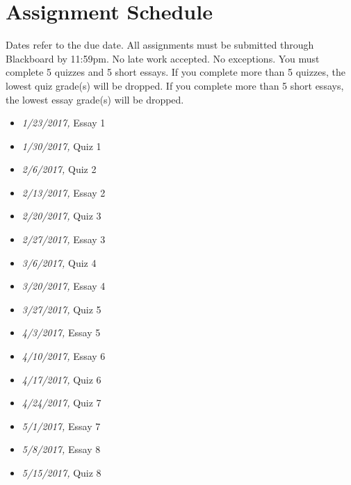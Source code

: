 \documentclass[article,oneside]{memoir}
\begin{document}
\section{ Assignment Schedule}
Dates refer to the due date. All assignments must be submitted through Blackboard by 11:59pm. No late work accepted. No exceptions. You must complete 5 quizzes and 5 short essays. If you complete more than 5 quizzes, the lowest quiz grade(s) will be dropped. If you complete more than 5 short essays, the lowest essay grade(s) will be dropped. 
\begin{itemize}
\item \textit{1/23/2017,} Essay 1
\item \textit{1/30/2017,} Quiz 1
\item \textit{2/6/2017,} Quiz 2
\item \textit{2/13/2017,} Essay 2
\item \textit{2/20/2017,} Quiz 3
\item \textit{2/27/2017,} Essay 3
\item \textit{3/6/2017,}  Quiz 4
\item \textit{3/20/2017,} Essay 4
\item \textit{3/27/2017,}  Quiz 5
\item \textit{4/3/2017,} Essay 5
\item \textit{4/10/2017,} Essay 6
\item \textit{4/17/2017,} Quiz 6
\item \textit{4/24/2017,} Quiz 7
\item \textit{5/1/2017,} Essay 7
\item \textit{5/8/2017,} Essay 8
\item \textit{5/15/2017,} Quiz  8
\end{itemize}




\end{document}
